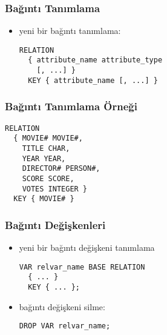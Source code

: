 \documentclass[dvipsnames]{beamer}
\theoremstyle{plain}
\begin{document}

\begin{frame}[fragile]
  \frametitle{Bağıntı Tanımlama}

  \begin{itemize}
    \item yeni bir bağıntı tanımlama:
    \begin{lstlisting}
RELATION
  { attribute_name attribute_type
    [, ...] }
  KEY { attribute_name [, ...] }
    \end{lstlisting}
  \end{itemize}
\end{frame}

\begin{frame}[fragile]
  \frametitle{Bağıntı Tanımlama Örneği}

 \begin{lstlisting}
RELATION
  { MOVIE# MOVIE#,
    TITLE CHAR,
    YEAR YEAR,
    DIRECTOR# PERSON#,
    SCORE SCORE,
    VOTES INTEGER }
  KEY { MOVIE# }
  \end{lstlisting}
\end{frame}

\begin{frame}[fragile]
  \frametitle{Bağıntı Değişkenleri}

  \begin{itemize}
    \item yeni bir bağıntı değişkeni tanımlama
    \begin{lstlisting}
VAR relvar_name BASE RELATION
  { ... }
  KEY { ... };
    \end{lstlisting}

    \item bağıntı değişkeni silme:
    \begin{lstlisting}
DROP VAR relvar_name;
    \end{lstlisting}
  \end{itemize}
\end{frame}

%
%
\end{document}
